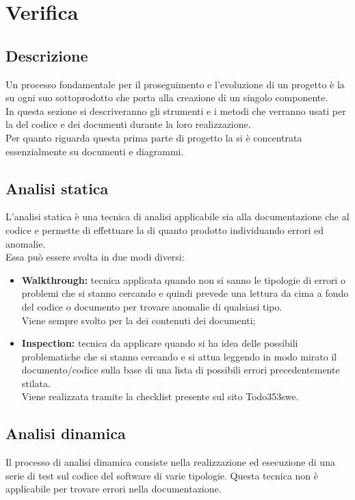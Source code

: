 \documentclass[NormeDiProgetto.tex]{subfiles}
\begin{document}
	
	\section{Verifica}
	
	\subsection{Descrizione}
	Un processo fondamentale per il proseguimento e l'evoluzione di un progetto è la  su ogni suo sottoprodotto che porta alla creazione di un singolo componente.\\
	In questa sezione si descriveranno gli strumenti e i metodi che verranno usati per la  del codice e dei documenti durante la loro realizzazione.\\
	Per quanto riguarda questa prima parte di progetto la  si è concentrata essenzialmente su documenti e diagrammi.
	
	\subsection{Analisi statica}
	L'analisi statica è una tecnica di analisi applicabile sia alla documentazione che al codice e permette di effettuare la  di quanto prodotto individuando errori ed anomalie.\\
	Essa può essere svolta in due modi diversi:
		\begin{itemize}
			\item \textbf{Walkthrough:} tecnica applicata quando non si sanno le tipologie di errori o problemi che si stanno cercando e quindi prevede una lettura da cima a fondo del codice o documento per trovare anomalie di qualsiasi tipo.\\
			Viene sempre svolto per la  dei contenuti dei documenti;
						
			\item \textbf{Inspection:} tecnica da applicare quando si ha idea delle possibili problematiche che si stanno cercando e si attua leggendo in modo mirato il documento/codice sulla base di una lista di possibili errori precedentemente stilata.\\
			Viene realizzata tramite la checklist presente sul sito Todo353swe.
		\end{itemize}
	
	\subsection{Analisi dinamica}
	Il processo di analisi dinamica consiste nella realizzazione ed esecuzione di una serie di test sul codice del software di varie tipologie. Questa tecnica non è applicabile per trovare errori nella documentazione.
	
\end{document}
